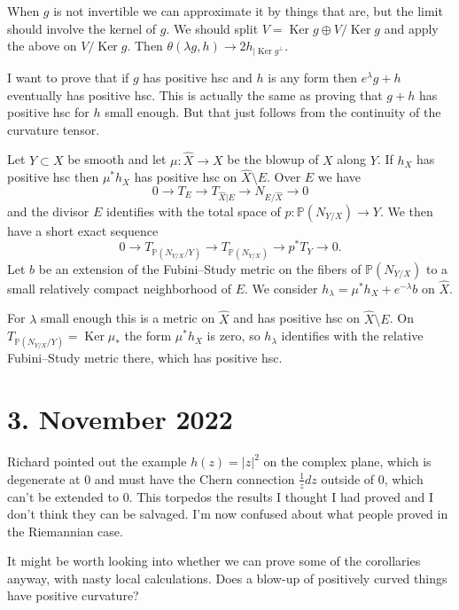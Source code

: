 \documentclass[11pt]{article}
\theoremstyle{definition}
\newcommand{\kk}[1]{\mathbb{#1}}
\DeclareMathOperator{\Ker}{Ker}
\begin{document}
When $g$ is not invertible we can approximate it by things that are, but the
limit should involve the kernel of $g$.
We should split $V = \Ker g \oplus V / \Ker g$ and apply the above on $V / \Ker g$.
Then $\theta(\lambda g, h) \to 2 h_{| \Ker g^\perp}$.



\medskip

I want to prove that if $g$ has positive hsc and $h$ is any form then
$e^\lambda g + h$ eventually has positive hsc.
This is actually the same as proving that $g + h$ has positive hsc for $h$
small enough.
But that just follows from the continuity of the curvature tensor.



\medskip

Let $Y \subset X$ be smooth and let $\mu : \hat X \to X$ be the blowup of $X$
along $Y$.
If $h_X$ has positive hsc then $\mu^* h_X$ has positive hsc on $\hat X \setminus E$.
Over $E$ we have
$$
0 \longrightarrow
T_E \longrightarrow
T_{\hat X|E} \longrightarrow
N_{E/\hat X} \longrightarrow
0
$$
and
the divisor $E$ identifies with the total space of $p:\kk P(N_{Y/X}) \to Y$.
We then have a short exact sequence
$$
0 \longrightarrow
T_{\kk P(N_{Y/X}/Y)} \longrightarrow
T_{\kk P(N_{Y/X})} \longrightarrow
p^* T_{Y} \longrightarrow
0.
$$
Let $b$ be an extension of the Fubini--Study metric on the fibers of $\kk
P(N_{Y/X})$ to a small relatively compact neighborhood of $E$.
We consider $h_\lambda = \mu^* h_X + e^{-\lambda} b$ on $\hat X$.

For $\lambda$ small enough this is a metric on $\hat X$ and has positive hsc on
$\hat X \setminus E$.
On $T_{\kk P(N_{Y/X}/Y)} = \Ker \mu_*$ the form $\mu^* h_X$ is zero, so
$h_\lambda$ identifies with the relative Fubini--Study metric there, which has
positive hsc.






\section{3. November 2022}

Richard pointed out the example $h(z) = |z|^2$ on the complex plane, which is
degenerate at $0$ and must have the Chern connection $\frac 1z dz$ outside of
$0$, which can't be extended to $0$.
This torpedos the results I thought I had proved and I don't think they can be
salvaged.
I'm now confused about what people proved in the Riemannian case.

It might be worth looking into whether we can prove some of the corollaries
anyway, with nasty local calculations.
Does a blow-up of positively curved things have positive curvature?
\end{document}
